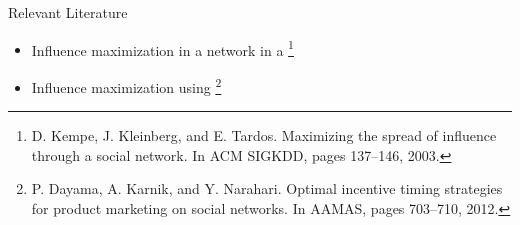 \documentclass{beamer}
\begin{document}
\begin{frame}{Relevant Literature}
  \begin{itemize}
    \item Influence maximization in a network in a {\color{blue}{single phase using seed nodes}}
    \footnote{\scriptsize D. Kempe, J. Kleinberg, and E. Tardos. Maximizing the spread of influence through a social network. In ACM SIGKDD, pages 137--146, 2003.}
    
    \item Influence maximization using {\color{red}{referral incentives}}
    \footnote{\scriptsize  P. Dayama, A. Karnik, and Y. Narahari. Optimal incentive timing strategies for product marketing on social networks. In AAMAS, pages 703--710, 2012.}
    

\end{itemize}
\end{frame}
\end{document}
